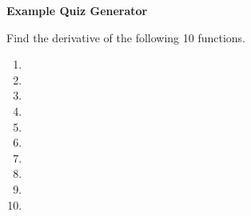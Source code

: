 \documentclass[dvipsnames,12pt]{article}
\begin{document}
\begin{center}
\bf{\Large{Example Quiz Generator}}
\end{center}


\flushleft
\noindent
Find the derivative of the following 10 functions.
\begin{enumerate}

\item

\vspace{30mm}

\item

\vspace{30mm}

\item

\vspace{30mm}

\item

\vspace{30mm}

\item

\vspace{30mm}

\newpage

\item

\vspace{40mm}

\item

\vspace{40mm}

\item

\vspace{40mm}

\item

\vspace{40mm}

\item

\end{enumerate}
\end{document}
